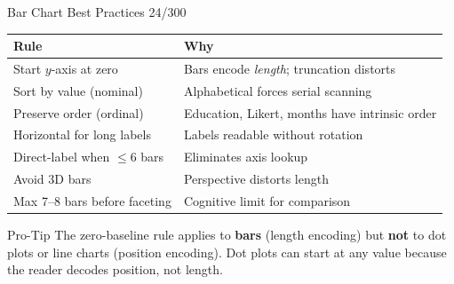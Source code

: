 \documentclass[10pt]{beamer}
\newcommand{\smark}[1]{\hfill{\scriptsize\color{codegray}#1}}
\begin{document}
\begin{frame}{Bar Chart Best Practices}
\smark{24/300}
\centering\small
\begin{tabular}{@{}ll@{}}
    \toprule
    \textbf{Rule} & \textbf{Why} \\
    \midrule
    Start $y$-axis at zero                & Bars encode \emph{length}; truncation distorts \\
    Sort by value (nominal)               & Alphabetical forces serial scanning \\
    Preserve order (ordinal)              & Education, Likert, months have intrinsic order \\
    Horizontal for long labels            & Labels readable without rotation \\
    Direct-label when $\leq 6$ bars       & Eliminates axis lookup \\
    Avoid 3D bars                         & Perspective distorts length \\
    Max 7--8 bars before faceting         & Cognitive limit for comparison \\
    \bottomrule
\end{tabular}

\vspace{0.3cm}
\begin{alertblock}{Pro-Tip}
    \scriptsize The zero-baseline rule applies to \textbf{bars} (length encoding) but \textbf{not} to dot plots or line charts (position encoding). Dot plots can start at any value because the reader decodes position, not length.
\end{alertblock}
\end{frame}
\end{document}
